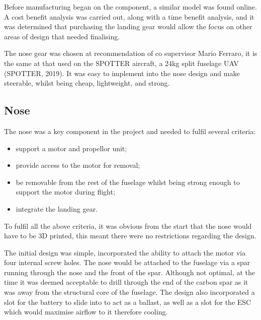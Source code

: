 \documentclass[../../main.tex]{subfiles}
\begin{document}
Before manufacturing began on the component, a similar model was found online. A cost benefit analysis was carried out, along with a time benefit analysis, and it was determined that purchasing the landing gear would allow the focus on other areas of design that needed finalising. 


The nose gear was chosen at recommendation of co supervisor Mario Ferraro, it is the same at that used on the SPOTTER aircraft, a 24kg split fuselage UAV (SPOTTER, 2019). It was easy to implement into the nose design and make steerable, whilst being cheap, lightweight, and strong. 

\subsection{Nose} \label{sec:design-process:final-design-proposal:nose}

The nose was a key component in the project and needed to fulfil several criteria:

\begin{itemize}
    \item support a motor and propellor unit;
    \item provide access to the motor for removal;
    \item be removable from the rest of the fuselage whilst being strong enough to support the motor during flight;
    \item integrate the landing gear.
\end{itemize}

To fulfil all the above criteria, it was obvious from the start that the nose would have to be 3D printed, this meant there were no restrictions regarding the design.  

The initial design was simple, incorporated the ability to attach the motor via four internal screw holes.
The nose would be attached to the fuselage via a spar running through the nose and the front of the spar.
Although not optimal, at the time it was deemed acceptable to drill through the end of the carbon spar as it was away from the structural core of the fuselage.
The design also incorporated a slot for the battery to slide into to act as a ballast, as well as a slot for the ESC which would maximise airflow to it therefore cooling. 

\end{document}
